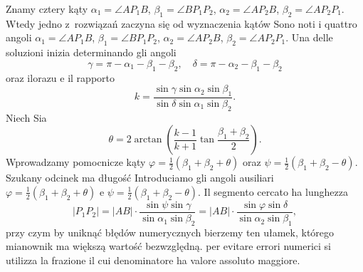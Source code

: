 Znamy cztery kąty $\alpha_1 = \angle AP_1B$, $\beta_1 = \angle BP_1 P_2$, $\alpha_2 = \angle  AP_2B$, $\beta_2 = \angle AP_2P_1$. %
Wtedy jedno z~rozwiązań zaczyna się od wyznaczenia kątów %
Sono noti i quattro angoli $\alpha_1 = \angle AP_1B$, $\beta_1 = \angle BP_1 P_2$, $\alpha_2 = \angle AP_2B$, $\beta_2 = \angle AP_2P_1$. %
Una delle soluzioni inizia determinando gli angoli %
\begin{equation}
    \gamma = \pi - \alpha_1 - \beta_1 - \beta_2, \quad
    \delta = \pi - \alpha_2 - \beta_1 - \beta_2
\end{equation}
oraz ilorazu %
e il rapporto %
\begin{equation}
    k = \frac{\sin \gamma \sin \alpha_2 \sin \beta_1}{\sin \delta \sin \alpha_1 \sin \beta_2}.
\end{equation}
Niech %
Sia %
\begin{equation}
    \theta = 2 \arctan \left(\frac{k-1}{k+1} \tan \frac{\beta_1 + \beta_2}{2} \right).
\end{equation}
Wprowadzamy pomocnicze kąty $\varphi = \frac 1 2 (\beta_1 + \beta_2 + \theta)$ oraz $\psi = \frac 1 2 (\beta_1 + \beta_2 - \theta)$. %
Szukany odcinek ma długość %
Introduciamo gli angoli ausiliari $\varphi = \frac 1 2 (\beta_1 + \beta_2 + \theta)$ e $\psi = \frac 1 2 (\beta_1 + \beta_2 - \theta)$. %
Il segmento cercato ha lunghezza %
\begin{equation}
    |P_1 P_2| = |AB| \cdot \frac{\sin \psi \sin \gamma}{\sin \alpha_1 \sin \beta_2} = |AB| \cdot \frac{\sin \varphi \sin \delta}{\sin \alpha_2 \sin \beta_1},
\end{equation}
przy czym by uniknąć błędów numerycznych bierzemy ten ułamek, którego mianownik ma większą wartość bezwzględną. %
per evitare errori numerici si utilizza la frazione il cui denominatore ha valore assoluto maggiore. %

%
